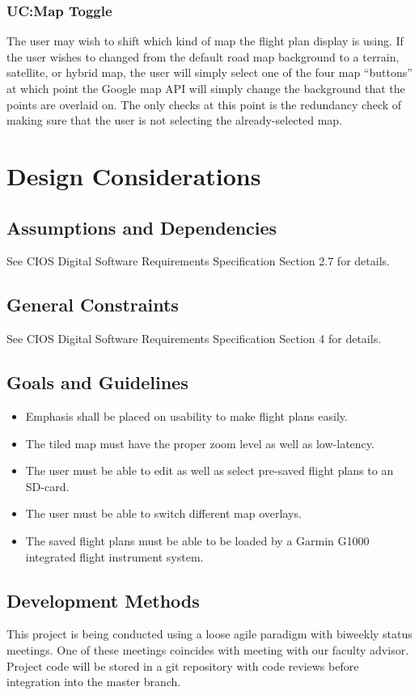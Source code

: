 \documentclass[12pt, letterpaper]{article}
\begin{document}
\clearpage
\subsubsection{UC:Map Toggle}
The user may wish to shift which kind of map the flight plan display is using.
If the user wishes to changed from the default road map background to a terrain, satellite, or hybrid map, the user will simply select one of the four map “buttons” at which point the Google map API will simply change the background that the points are overlaid on.
The only checks at this point is the redundancy check of making sure that the user is not selecting the already-selected map.

\clearpage
\section{Design Considerations} \label{dsign}
  \subsection{Assumptions and Dependencies}
    See CIOS Digital Software Requirements Specification Section 2.7 for details.
  \subsection{General Constraints}
    See CIOS Digital Software Requirements Specification Section 4 for details.
  \subsection{Goals and Guidelines}
    \begin{itemize}
      \setlength{\itemsep}{1pt}
      \setlength{\parskip}{0pt}
      \setlength{\parsep}{0pt}
      \item Emphasis shall be placed on usability to make flight plans easily.
      \item The tiled map must have the proper zoom level as well as low-latency.
      \item The user must be able to edit as well as select pre-saved flight plans to an SD-card.
      \item The user must be able to switch different map overlays.
      \item The saved flight plans must be able to be loaded by a Garmin G1000 integrated flight instrument system.
    \end{itemize}
  \subsection{Development Methods}
    This project is being conducted using a loose agile paradigm with biweekly status meetings.
    One of these meetings coincides with meeting with our faculty advisor.
    Project code will be stored in a git repository with code reviews before integration into the master branch.
\end{document}

